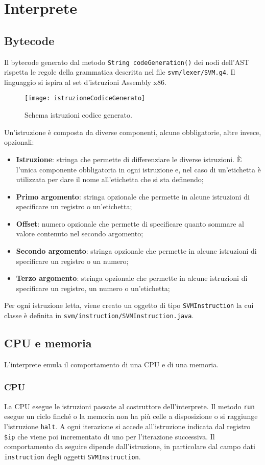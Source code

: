 \documentclass[../report.tex]{subfiles}
\begin{document}
\chapter{Interprete}\label{c:interprete}
\section{Bytecode}\label{s:bytecode}
Il bytecode generato dal metodo \verb|String codeGeneration()| dei nodi dell'AST rispetta le regole della grammatica descritta nel file \verb|svm/lexer/SVM.g4|. Il linguaggio si ispira al set d'istruzioni Assembly x86. 
\begin{figure}[H]
    \centering
    \texttt{[image: istruzioneCodiceGenerato]}
    \caption{Schema istruzioni codice generato.}
    \label{fig:istruzione-codice-generato}
\end{figure}
Un'istruzione \`e composta da diverse componenti, alcune obbligatorie, altre invece, opzionali:
\begin{itemize}
    \item \textbf{Istruzione}: stringa che permette di differenziare le diverse istruzioni. \`E l'unica componente obbligatoria in ogni istruzione e, nel caso di un'etichetta \`e utilizzata per dare il nome all'etichetta che si sta definendo;
    \item \textbf{Primo argomento}: stringa opzionale che permette in alcune istruzioni di specificare un registro o un'etichetta;
    \item \textbf{Offset}: numero opzionale che permette di specificare quanto sommare al valore contenuto nel secondo argomento;
    \item \textbf{Secondo argomento}: stringa opzionale che permette in alcune istruzioni di specificare un registro o un numero;
    \item \textbf{Terzo argomento}: stringa opzionale che permette in alcune istruzioni di specificare un registro, un numero o un'etichetta;
\end{itemize}
Per ogni istruzione letta, viene creato un oggetto di tipo \verb|SVMInstruction| la cui classe \`e definita in \verb|svm/instruction/SVMInstruction.java|.
\section{CPU e memoria}\label{s:cpu-e-memoria}
L'interprete emula il comportamento di una CPU e di una memoria.
\subsection{CPU}\label{ss:cpu}
La CPU esegue le istruzioni passate al costruttore dell'interprete. Il metodo \verb|run| esegue un ciclo finch\'e o la memoria non ha pi\`u celle a disposizione o si raggiunge l'istruzione \verb|halt|. A ogni iterazione si accede all'istruzione indicata dal registro \verb|$ip| che viene poi incrementato di uno per l'iterazione successiva. Il comportamento da seguire dipende dall'istruzione, in particolare dal campo dati \verb|instruction| degli oggetti \verb|SVMInstruction|.
\end{document}
